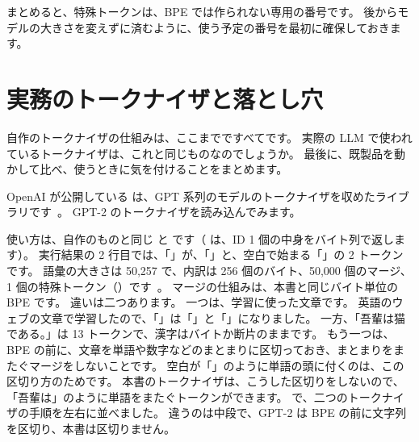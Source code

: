 まとめると、特殊トークンは、BPE では作られない専用の番号です。
後からモデルの大きさを変えずに済むように、使う予定の番号を最初に確保しておきます。

\section{実務のトークナイザと落とし穴}\label{sec:tok-practice}

自作のトークナイザの仕組みは、ここまでですべてです。
実際の LLM で使われているトークナイザは、これと同じものなのでしょうか。
最後に、既製品を動かして比べ、使うときに気を付けることをまとめます。

OpenAI が公開している  は、GPT 系列のモデルのトークナイザを収めたライブラリです~\cite{openai2022tiktoken}。
GPT-2 のトークナイザを読み込んでみます。


使い方は、自作のものと同じ  と  です（ は、ID 1 個の中身をバイト列で返します）。
実行結果の 2 行目では、「」が、「」と、空白で始まる「」の 2 トークンです。
語彙の大きさは 50,257 で、内訳は 256 個のバイト、50,000 個のマージ、1 個の特殊トークン（）です~\cite{radford2019language}。
マージの仕組みは、本書と同じバイト単位の BPE です。
違いは二つあります。
一つは、学習に使った文章です。
英語のウェブの文章で学習したので、「」は「」と「」になりました。
一方、「吾輩は猫である。」は 13 トークンで、漢字はバイトか断片のままです。
もう一つは、BPE の前に、文章を単語や数字などのまとまりに区切っておき、まとまりをまたぐマージをしないことです。
空白が「」のように単語の頭に付くのは、この区切り方のためです。
本書のトークナイザは、こうした区切りをしないので、「吾輩は」のように単語をまたぐトークンができます。
で、二つのトークナイザの手順を左右に並べました。
違うのは中段で、GPT-2 は BPE の前に文字列を区切り、本書は区切りません。

